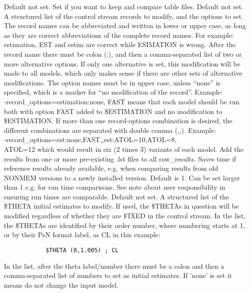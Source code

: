 \begin{optionlist}
			\nextopt
			Default not set. Set if you want to keep and compare table files.
			\nextopt
			Default not set.
			A structured list of the control stream records to modify, and the options to set. 
			The record names can be abbreviated and written in lower or upper case,
			as long as they are correct abbreviations of the complete record names. 
			For example: estimation, EST and estim are correct while ESIMATION
			is wrong. After the record name there must be colon (:), and then
			a comma-separated list of two or more alternative options.
			If only one alternative is set, this modification will be made to all models, 
			which only makes sense if there are other sets of alternative modifications.
			The option names must be in upper case, unless ``none'' is specified, which is 
			a marker for ``no modification of the record''. Example: \\
			-record\_options=estimation:none, FAST means that
			each model should be run both with option FAST added to \$ESTIMATION and no modification to 
			\$ESTIMATION.
			If more than one record-options combination is desired, the different combinations are 
			separated with double comma (,,). Example: \\
			-record\_options=est:none,FAST,,est:ATOL=10,ATOL=8,\\ATOL=12 
			which would result in six (2 times 3) variants of each model.
			\nextopt
			Add the results from one or more pre-existing .lst files to all raw\_results.
			Saves time if reference results already available, e.g. when comparing results
			from old NONMEM versions to a newly installed version.
			\nextopt
			Default is 1. Can be set larger than 1 e.g. for run time comparisons.
			See note about user responsibility in ensuring run times are comparable.
			\nextopt
			Default not set.
			A structured list of the \$THETA initial estimates to modify. If used, the 
			\$THETAs in question will be modified regardless of whether they are FIXED in the control stream.
			In the list, the \$THETAs are identified by their order number, where numbering starts at 1,
			or by their PsN format label, as CL in this example:
			\begin{verbatim}
			$THETA (0,1.005) ; CL
			\end{verbatim}
			In the list, after the theta label/number there must be a colon and then a comma-separated list
			of numbers to set as initial estimates. If 'none' is set it means do not change the input model.

\end{optionlist}
